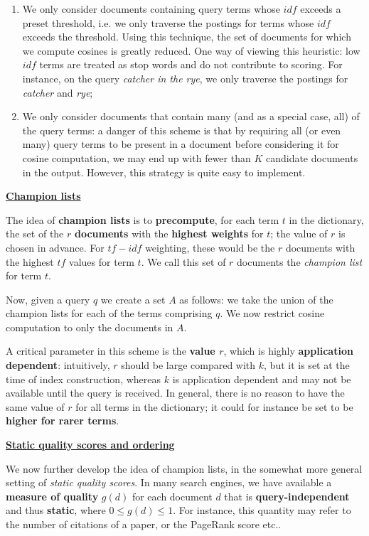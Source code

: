 \begin{enumerate}
    \item We only consider documents containing query terms whose $idf$ exceeds a preset threshold, i.e. we only traverse the postings for terms whose $idf$ exceeds the threshold. Using this technique, the set of documents for which we compute cosines is greatly reduced. One way of viewing this heuristic: low $idf$ terms are treated as stop words and do not contribute to scoring. For instance, on the query \textit{catcher in the rye}, we only traverse the postings for \textit{catcher} and \textit{rye};
    \item We only consider documents that contain many (and as a special case, all) of the query terms: a danger of this scheme is that by requiring all (or even many) query terms to be present in a document before considering it for cosine computation, we may end up with fewer than $K$ candidate documents in the output. However, this strategy is quite easy to implement.
\end{enumerate}

\underline{\textbf{\textbf{Champion lists}}}

The idea of \textbf{champion lists} is to \textbf{precompute}, for each term $t$ in the dictionary, the set of the $r$ \textbf{documents} with the \textbf{highest weights} for $t$; the value of $r$ is chosen in advance. For $tf-idf$ weighting, these would be the $r$ documents with the highest $tf$ values for term $t$. We call this set of $r$ documents the \textit{champion list} for term $t$. 

Now, given a query $q$ we create a set $A$ as follows: we take the union of the champion lists for each of the terms comprising $q$. We now restrict cosine computation to only the documents in $A$. 

A critical parameter in this scheme is the \textbf{value $r$}, which is highly \textbf{application dependent}: intuitively, $r$ should be large compared with $k$, but it is set at the time of index construction, whereas $k$ is application dependent and may not be available until the query is received. In general, there is no reason to have the same value of $r$ for all terms in the dictionary; it could for instance be set to be \textbf{higher for rarer terms}.

\underline{\textbf{\textbf{Static quality scores and ordering}}}

We now further develop the idea of champion lists, in the somewhat more general setting of \textit{static quality scores}. In many search engines, we have available a \textbf{measure of quality} $g(d)$ for each document $d$ that is \textbf{query-independent} and thus \textbf{static}, where $0 \leq g(d) \leq 1$. For instance, this quantity may refer to the number of citations of a paper, or the PageRank score etc..


